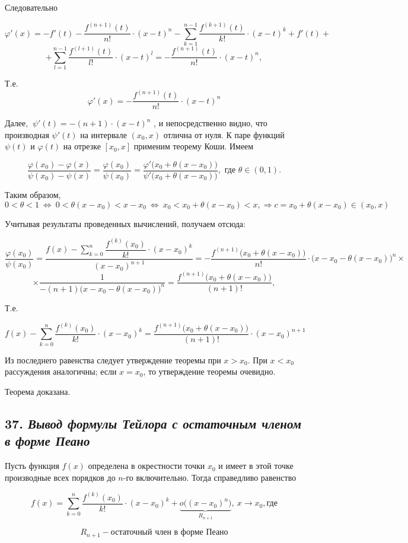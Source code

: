 Следовательно

$$
\varphi'(x) = -f'(t) -\dfrac{f^{(n+1)}(t)}{n!}
\cdot (x - t)^n - \sum\limits_{k=1}^{n-1} \dfrac{f^{(k+1)}(t) }{k!}\cdot (x - t)^k + f'(t) +
$$ $$
+ \sum\limits_{l=1}^{n-1} \dfrac{f^{(l+1)}(t) }{l!}\cdot (x - t)^l = -\dfrac{f^{(n+1)}(t)}{n!} \cdot (x - t)^n,
$$

Т.е. $$
\varphi'(x) =-\dfrac{f^{(n+1)}(t)}{n!} \cdot (x - t)^n
$$

Далее, $\ \psi'(t) = -(n + 1)\cdot (x - t)^n$ , и непосредственно видно, что производная $\psi'(t)$ на интервале $(x_0, x)$ отлична от нуля. К паре функций $\psi(t)$ и $\varphi(t)$ на отрезке $[x_0, x]$ применим теорему Коши. Имеем

$$
\dfrac{\varphi(x_0) - \varphi(x)}{\psi(x_0) - \psi(x)} = \dfrac{\varphi(x_0)}{\psi(x_0)} =\dfrac{\varphi'\big(x_0 + \theta(x - x_0)\big)}{\psi'\big(x_0+\theta(x - x_0)\big)} , \text{ где } \theta \in (0, 1).
$$

Таким образом, $0 < \theta<1 \ \iff \ 0 < \theta (x - x_0) < x - x_0 \ \iff \ x_0 < x_0 + \theta (x - x_0) < x, \Rightarrow c = x_0 + \theta (x - x_0) \in (x_0, x)$

Учитывая результаты проведенных вычислений, получаем отсюда:

$$
\dfrac{\varphi(x_0)}{\psi(x_0)} = \dfrac{f(x) - \sum\limits_{k=0}^n{\dfrac{f^{(k)}(x_0)}{k!}}\cdot (x - x_0)^k}{(x - x_0)^{n + 1}} = - \dfrac{f^{(n + 1)}\big(x_0 + \theta(x - x_0)\big)}{n!}\cdot \big(x - x_0 - \theta(x - x_0)\big)^n\times
$$ $$
\times \dfrac{1}{-(n + 1)\big(x - x_0 - \theta(x - x_0)\big)^n} = \dfrac{f^{(n+1)}\big(x_0 + \theta(x - x_0)\big)}{(n+1)!},
$$

Т.е.

$$
f(x) - \sum\limits_{k=0}^n{\dfrac{f^{(k)}(x_0)}{k!}}\cdot (x - x_0)^k = {\dfrac{f^{(n+1)}\big(x_0 + \theta(x - x_0)\big)}{(n+1)!}}\cdot (x - x_0)^{n + 1}
$$

Из последнего равенства следует утверждение теоремы при $x > x_0$. При $x < x_0$ рассуждения аналогичны; если $x = x_0$, то утверждение теоремы очевидно.

Теорема доказана.
\newpage 
\subsection*{37. \textit{Вывод формулы Тейлора с остаточным членом в форме Пеано}}

Пусть функция $f(x)$ определена в окрестности точки $x_0$ и имеет в этой точке производные всех порядков до $n$-го включительно. Тогда справедливо равенство
\begin{mainQuote}

$$ f(x) = \sum\limits_{k=0}^n\dfrac{f^{(k)}(x_0)}{k!}\cdot (x - x_0)^k + \underbrace{o\big((x - x_0)^n\big)}_{R_{n+1}}, \ x \rightarrow x_0, \text{где} $$

$$ R_{n+1} - \text{остаточный член в форме Пеано}$$
\end{mainQuote}

